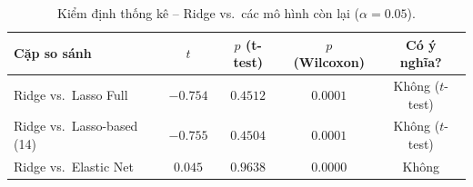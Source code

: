 \documentclass[12pt, a4paper]{article}
\begin{document}
\begin{table}[H]
  \centering
  \caption{10-Fold CV (mean $\pm$ std) -- các mô hình Regularization.}
  \label{tab:reg_cv}
\end{table}

\begin{table}[H]
  \centering
  \caption{Kiểm định thống kê -- Ridge vs.\ các mô hình còn lại ($\alpha=0.05$).}
  \label{tab:reg_stat}
  \begin{tabular}{lcccc}
    \toprule
    \textbf{Cặp so sánh} & $t$ & $p$ (t-test) & $p$ (Wilcoxon)
      & \textbf{Có ý nghĩa?} \\
    \midrule
    Ridge vs.\ Lasso Full
      & $-0.754$ & $0.4512$ & $0.0001$ & Không ($t$-test) \\
    Ridge vs.\ Lasso-based (14)
      & $-0.755$ & $0.4504$ & $0.0001$ & Không ($t$-test) \\
    Ridge vs.\ Elastic Net
      & $0.045$  & $0.9638$ & $0.0000$ & Không \\
    \bottomrule
  \end{tabular}
\end{table}
\end{document}
